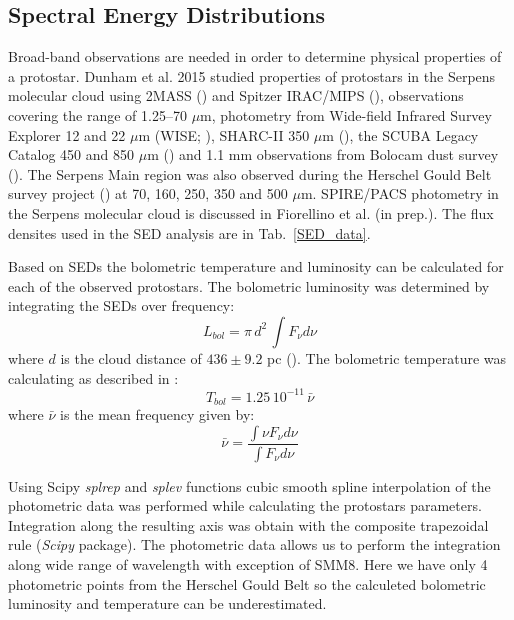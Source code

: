 \documentclass{aa}
\begin{document}
%
%
\begin{appendix} %
\section{Spectral Energy Distributions}

Broad-band observations are needed in order to determine physical properties of a protostar. Dunham
et al. 2015 studied properties of protostars in the Serpens molecular cloud using 2MASS
(\citealt{Skr06}) and Spitzer IRAC/MIPS (\citealt{Eva09}), observations covering the range of
1.25–70 $\mu$m, photometry from Wide-field Infrared Survey Explorer 12 and 22 $\mu$m (WISE;
\citealt{Wri10}), SHARC-II 350 $\mu$m (\citealt{Sur16}), the SCUBA Legacy Catalog 450 and 850 $\mu$m
(\citealt{dFr08}) and 1.1 mm observations from Bolocam dust survey (\citealt{Eno07}). The Serpens
Main region was also observed during the Herschel Gould Belt survey project (\citealt{And10}) at 70, 160, 250, 350 and 500 $\mu$m.
SPIRE/PACS photometry in the Serpens molecular cloud is discussed in Fiorellino et al. (in prep.). The flux densites used in the SED analysis are in Tab.~\ref{SED_data}.

Based on SEDs the bolometric temperature and luminosity can be calculated for each of the observed
protostars. The bolometric luminosity was determined by integrating the SEDs over frequency:
\begin{equation} \label{eq6} L_{bol} = \pi \, d^2 \, \int F_\nu d\nu \end{equation} where $d$ is the
cloud distance of $436 \pm 9.2$ pc (\citealt{Ort17}). The bolometric temperature was calculating as
described in \citealt{Mye93}: \begin{equation} \label{eq7} T_{bol} = 1.25 \, 10^{-11} \, \bar{\nu}
\end{equation} where $\bar{\nu}$ is the mean frequency given by: \begin{equation} \label{eq8}
\bar{\nu} = \frac{\int \nu F_\nu d\nu}{ \int F_\nu d\nu} \end{equation}

Using Scipy \textit{splrep} and \textit{splev} functions cubic smooth spline interpolation of the
photometric data was performed while calculating the protostars parameters. Integration along the
resulting axis was obtain with the composite trapezoidal rule (\textit{Scipy} package). The
photometric data allows us to perform the integration along wide range of wavelength with exception
of SMM8. Here we have only 4 photometric points from the Herschel Gould Belt so the calculeted
bolometric luminosity and temperature can be underestimated.


\end{appendix}
\end{document}
